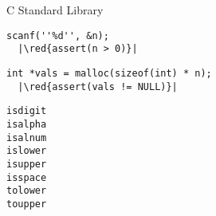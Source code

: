 \begin{frame}{}
  \centerline{\LARGE C Standard Library}

  \vspace{0.60cm}
\end{frame}

\begin{frame}{}
\end{frame}

\begin{frame}{}
\end{frame}

\begin{frame}[fragile]{}
  \centerline{\large {}}

  \vspace{0.50cm}
  \begin{lstlisting}[style = Cstyle]
  scanf(''%d'', &n);
  |\red{assert(n > 0)}|
  \end{lstlisting}

  \pause
  \vspace{0.50cm}
  \begin{lstlisting}[style = Cstyle]
  int *vals = malloc(sizeof(int) * n);
  |\red{assert(vals != NULL)}|
  \end{lstlisting}
\end{frame}

\begin{frame}{}
  \centerline{\large {}}

  \begin{center}
    {\large
    \texttt{isdigit}\\[0.10cm]
    \texttt{isalpha}\\[0.10cm]
    \texttt{isalnum}\\[0.40cm]

    \texttt{islower}\\[0.10cm]
    \texttt{isupper}\\[0.40cm]

    \texttt{isspace}\\[0.40cm]

    \texttt{tolower}\\[0.10cm]
    \texttt{toupper}
    }
  \end{center}
\end{frame}

